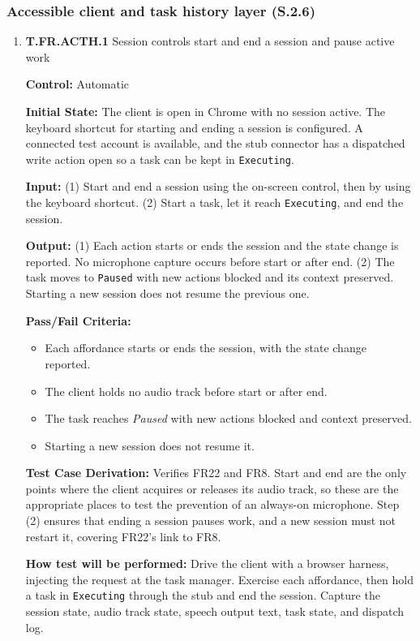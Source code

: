 \documentclass[12pt, titlepage]{article}
\begin{document}
\subsubsection{Accessible client and task history layer (S.2.6)}
\begin{enumerate}
\item{\textbf{T.FR.ACTH.1} Session controls start and end a session and pause active work\\}\label{test:T.FR.ACTH.1}

\textbf{Control:} Automatic

\textbf{Initial State:} The client is open in Chrome with no session active. The keyboard shortcut for starting and ending a session is configured. A connected test account is available,
and the stub connector has a dispatched write action open so a task can be kept in \texttt{Executing}.

\textbf{Input:} (1) Start and end a session using the on-screen control, then by using the keyboard shortcut. (2) Start a task, let it reach \texttt{Executing}, and end the session.

\textbf{Output:} (1) Each action starts or ends the session and the state change is reported. No microphone capture occurs before start or after end.
(2) The task moves to \texttt{Paused} with new actions blocked and its context preserved. Starting a new session does not resume the previous one.

\textbf{Pass/Fail Criteria:}
\begin{itemize}
  \item Each affordance starts or ends the session, with the state change reported.
  \item The client holds no audio track before start or after end.
  \item The task reaches \textit{Paused} with new actions blocked and context preserved.
  \item Starting a new session does not resume it.
\end{itemize}

\textbf{Test Case Derivation:} Verifies FR22 and FR8. Start and end are the only points where the client acquires or releases its audio track, so these are the appropriate places to test
the prevention of an always-on microphone. Step (2) ensures that ending a session pauses work, and a new session must not restart it, covering FR22's link to FR8.

\textbf{How test will be performed:} Drive the client with a browser harness, injecting the request at the task manager. Exercise each affordance, then hold a task in \texttt{Executing} through
the stub and end the session. Capture the session state, audio track state, speech output text, task state, and dispatch log.



\end{enumerate}
\end{document}
